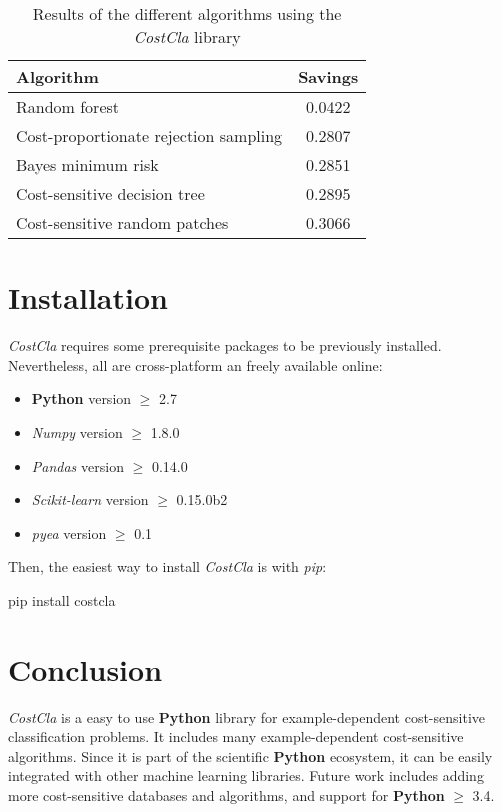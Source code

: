 \begin{table}[!t]
    \centering
    \footnotesize
    \begin{tabular}{l|c}
      Algorithm & Savings \\
      \hline
      Random forest & 0.0422 \\
      Cost-proportionate rejection sampling & 0.2807\\
      Bayes minimum risk & 0.2851\\
      Cost-sensitive decision tree & 0.2895\\
      Cost-sensitive random patches & 0.3066\\   
    \end{tabular}
    \caption{Results of the different algorithms using the \textit{CostCla} library}
    \label{tab:9:1}
  \end{table}  

\section{Installation}

\textit{CostCla} requires some prerequisite packages to be previously installed. Nevertheless, all 
are cross-platform an freely available online:
\begin{itemize}
 \item \textbf{Python} version $\ge$ 2.7
 \item \textit{Numpy} version $\ge$ 1.8.0
 \item \textit{Pandas} version $\ge$ 0.14.0
 \item \textit{Scikit-learn} version $\ge$ 0.15.0b2
 \item \textit{pyea} version $\ge$ 0.1
\end{itemize}

\noindent Then, the easiest way to install \textit{CostCla}  is with \textit{pip}:
\vskip0.3cm
\begin{pythoncode}
pip install costcla
\end{pythoncode}

\section{Conclusion}
\textit{CostCla} is a easy to use \textbf{Python} library for example-dependent cost-sensitive 
classification problems. It includes many example-dependent cost-sensitive algorithms. Since 
it is part of the scientific \textbf{Python} ecosystem, it can be easily integrated with other 
machine learning libraries. Future work includes adding more cost-sensitive databases and 
algorithms, and support for \textbf{Python} $\ge$ 3.4. 
